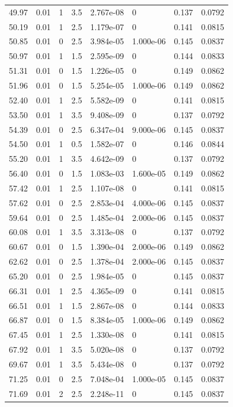 \documentclass[preview]{standalone}
\begin{document}
{{{\begin{tabular}{L{1.2cm}C{1.2cm} C{0.3cm}C{0.5cm} C{1.4cm}C{1.4cm} C{1.4cm}C{1.4cm}}
  49.97  &  0.01  & 1     & 3.5 &  2.767e-08  & 0  & 0.137 &  0.0792   \\ 
  50.19  &  0.01  & 1     & 2.5 &  1.179e-07  & 0  & 0.141 &  0.0815   \\ 
  50.85  &  0.01  & 0     & 2.5 &  3.984e-05  & 1.000e-06  & 0.145 &  0.0837   \\ 
  50.97  &  0.01  & 1     & 1.5 &  2.595e-09  & 0  & 0.144 &  0.0833   \\ 
  51.31  &  0.01  & 0     & 1.5 &  1.226e-05  & 0  & 0.149 &  0.0862   \\ 
  51.96  &  0.01  & 0     & 1.5 &  5.254e-05  & 1.000e-06  & 0.149 &  0.0862   \\ 
  52.40  &  0.01  & 1     & 2.5 &  5.582e-09  & 0  & 0.141 &  0.0815   \\ 
  53.50  &  0.01  & 1     & 3.5 &  9.408e-09  & 0  & 0.137 &  0.0792   \\ 
  54.39  &  0.01  & 0     & 2.5 &  6.347e-04  & 9.000e-06  & 0.145 &  0.0837   \\ 
  54.50  &  0.01  & 1     & 0.5 &  1.582e-07  & 0  & 0.146 &  0.0844   \\ 
  55.20  &  0.01  & 1     & 3.5 &  4.642e-09  & 0  & 0.137 &  0.0792   \\ 
  56.40  &  0.01  & 0     & 1.5 &  1.083e-03  & 1.600e-05  & 0.149 &  0.0862   \\ 
  57.42  &  0.01  & 1     & 2.5 &  1.107e-08  & 0  & 0.141 &  0.0815   \\ 
  57.62  &  0.01  & 0     & 2.5 &  2.853e-04  & 4.000e-06  & 0.145 &  0.0837   \\ 
  59.64  &  0.01  & 0     & 2.5 &  1.485e-04  & 2.000e-06  & 0.145 &  0.0837   \\ 
  60.08  &  0.01  & 1     & 3.5 &  3.313e-08  & 0  & 0.137 &  0.0792   \\ 
  60.67  &  0.01  & 0     & 1.5 &  1.390e-04  & 2.000e-06  & 0.149 &  0.0862   \\ 
  62.62  &  0.01  & 0     & 2.5 &  1.378e-04  & 2.000e-06  & 0.145 &  0.0837   \\ 
  65.20  &  0.01  & 0     & 2.5 &  1.984e-05  & 0  & 0.145 &  0.0837   \\ 
  66.31  &  0.01  & 1     & 2.5 &  4.365e-09  & 0  & 0.141 &  0.0815   \\ 
  66.51  &  0.01  & 1     & 1.5 &  2.867e-08  & 0  & 0.144 &  0.0833   \\ 
  66.87  &  0.01  & 0     & 1.5 &  8.384e-05  & 1.000e-06  & 0.149 &  0.0862   \\ 
  67.45  &  0.01  & 1     & 2.5 &  1.330e-08  & 0  & 0.141 &  0.0815   \\ 
  67.92  &  0.01  & 1     & 3.5 &  5.020e-08  & 0  & 0.137 &  0.0792   \\ 
  69.67  &  0.01  & 1     & 3.5 &  5.434e-08  & 0  & 0.137 &  0.0792   \\ 
  71.25  &  0.01  & 0     & 2.5 &  7.048e-04  & 1.000e-05  & 0.145 &  0.0837   \\ 
  71.69  &  0.01  & 2     & 2.5 &  2.248e-11  & 0  & 0.145 &  0.0837   \\ 
\hline 
\end{tabular} 

}}}
\end{document}
